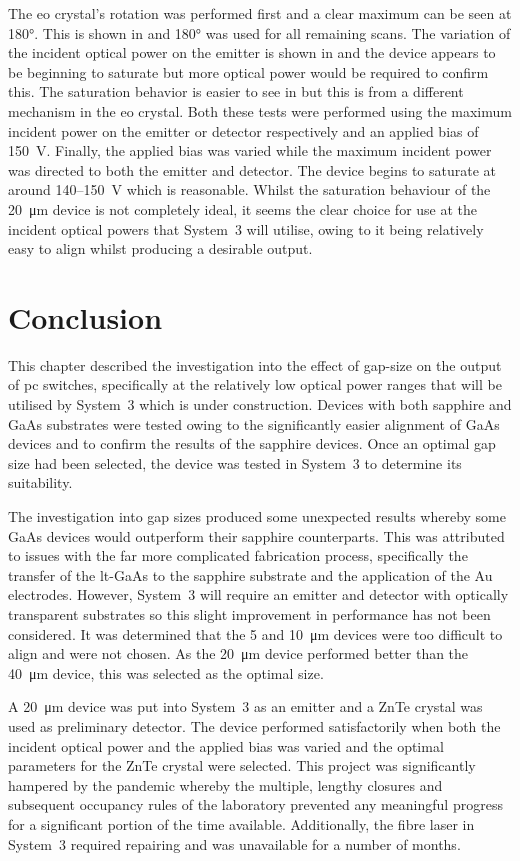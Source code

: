 The \acrshort{eo} crystal's rotation was performed first and a clear maximum can be seen at \ang{180}. This is shown in  and \ang{180} was used for all remaining scans. The variation of the incident optical power on the emitter is shown in  and the device appears to be beginning to saturate but more optical power would be required to confirm this. The saturation behavior is easier to see in  but this is from a different mechanism in the \acrshort{eo} crystal. Both these tests were performed using the maximum incident power on the emitter or detector respectively and an applied bias of \SI{150}{V}. Finally, the applied bias was varied while the maximum incident power was directed to both the emitter and detector. The device begins to saturate at around 140--\SI{150}{V} which is reasonable. Whilst the saturation behaviour of the \SI{20}{\micro\metre} device is not completely ideal, it seems the clear choice for use at the incident optical powers that System~3 will utilise, owing to it being relatively easy to align whilst producing a desirable output. 

\section{Conclusion}
This chapter described the investigation into the effect of gap\nobreakdash-size on the output of \acrshort{pc} switches, specifically at the relatively low optical power ranges that will be utilised by System~3 which is under construction. Devices with both sapphire and GaAs substrates were tested owing to the significantly easier alignment of GaAs devices and to confirm the results of the sapphire devices. Once an optimal gap size had been selected, the device was tested in System~3 to determine its suitability.

The investigation into gap sizes produced some unexpected results whereby some GaAs devices would outperform their sapphire counterparts. This was attributed to issues with the far more complicated fabrication process, specifically the transfer of the \acrshort{lt}\nobreakdash-GaAs to the sapphire substrate and the application of the Au electrodes. However, System~3 will require an emitter and detector with optically transparent substrates so this slight improvement in performance has not been considered. It was determined that the 5 and \SI{10}{\micro\metre} devices were too difficult to align and were not chosen. As the \SI{20}{\micro\metre} device performed better than the \SI{40}{\micro\metre} device, this was selected as the optimal size.

A \SI{20}{\micro\metre} device was put into System~3 as an emitter and a ZnTe crystal was used as preliminary detector. The device performed satisfactorily when both the incident optical power and the applied bias was varied and the optimal parameters for the ZnTe crystal were selected. This project was significantly hampered by the pandemic whereby the multiple, lengthy closures and subsequent occupancy rules of the laboratory prevented any meaningful progress for a significant portion of the time available. Additionally, the fibre laser in System~3 required repairing and was unavailable for a number of months.


